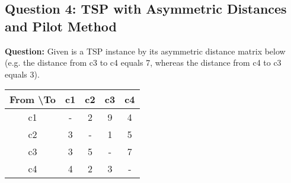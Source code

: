 \subsection{Question 4: TSP with Asymmetric Distances and Pilot Method}
\textbf{Question:} Given is a TSP instance by its asymmetric distance matrix below (e.g. the distance from c3 to c4 equals 7, whereas the distance from c4 to c3 equals 3).

\begin{center}
\begin{tabular}{|c|c|c|c|c|}
\hline
\textbf{From} \textbackslash \textbf{To} & c1 & c2 & c3 & c4 \\
\hline
c1 & - & 2 & 9 & 4 \\
\hline
c2 & 3 & - & 1 & 5 \\
\hline
c3 & 3 & 5 & - & 7 \\
\hline
c4 & 4 & 2 & 3 & - \\
\hline
\end{tabular}
\end{center}

